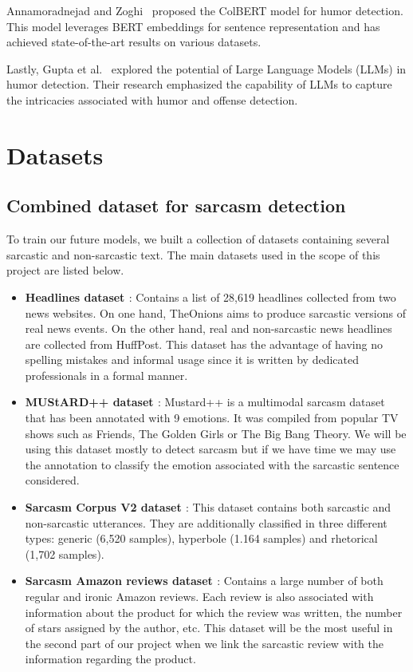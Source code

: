 \documentclass[10pt,twocolumn,letterpaper]{article}
\begin{document}
Annamoradnejad and Zoghi~\cite{annamoradnejad2020} proposed the ColBERT model for humor detection. This model leverages BERT embeddings for sentence representation and has achieved state-of-the-art results on various datasets.

Lastly, Gupta et al.~\cite{gupta2021} explored the potential of Large Language Models (LLMs) in humor detection. Their research emphasized the capability of LLMs to capture the intricacies associated with humor and offense detection.


\section{Datasets}
\subsection{Combined dataset for sarcasm detection}

To train our future models, we built a collection of datasets containing several sarcastic and non-sarcastic text. 
The main datasets used in the scope of this project are listed below.
\begin{itemize}
    \item {\bfseries Headlines dataset \cite{misra2019}}: Contains a list of 28,619 headlines collected from two news websites.
    On one hand, TheOnions aims to produce sarcastic versions of real news events.
    On the other hand, real and non-sarcastic news headlines are collected from HuffPost. This dataset has the advantage of having no spelling mistakes and informal usage since it is written by dedicated professionals in a formal manner.
    \item {\bfseries MUStARD++ dataset \cite{mustard2022}}: Mustard++ is a multimodal sarcasm dataset that has been annotated with 9 emotions.
    It was compiled from popular TV shows such as Friends, The Golden Girls or The Big Bang Theory. We will be using this dataset mostly to detect sarcasm but if we have time we may use the annotation to classify the emotion associated with the sarcastic sentence considered.
    \item {\bfseries Sarcasm Corpus V2 dataset \cite{oraby2016}}: This dataset contains both sarcastic and non-sarcastic utterances.
    They are additionally classified in three different types: generic (6,520 samples), hyperbole (1.164 samples) and rhetorical (1,702 samples).
    \item {\bfseries Sarcasm Amazon reviews dataset \cite{filatova2012}}: Contains a large number of both regular and ironic Amazon reviews.
    Each review is also associated with information about the product for which the review was written, the number of stars assigned by the author, etc.
    This dataset will be the most useful in the second part of our project when we link the sarcastic review with the information regarding the product.
\end{itemize}
\end{document}
